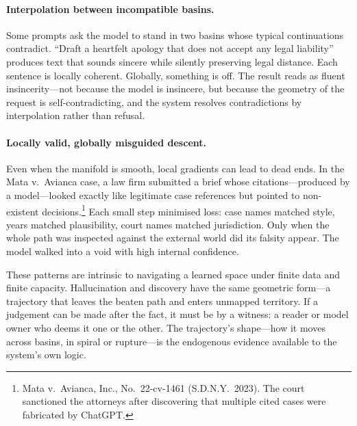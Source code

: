 \paragraph{Interpolation between incompatible basins.} Some prompts ask the model to stand in two basins whose typical continuations contradict. ``Draft a heartfelt apology that does not accept any legal liability'' produces text that sounds sincere while silently preserving legal distance. Each sentence is locally coherent. Globally, something is off. The result reads as fluent insincerity---not because the model is insincere, but because the geometry of the request is self-contradicting, and the system resolves contradictions by interpolation rather than refusal.

\paragraph{Locally valid, globally misguided descent.} Even when the manifold is smooth, local gradients can lead to dead ends. In the Mata v.\ Avianca case, a law firm submitted a brief whose citations---produced by a model---looked exactly like legitimate case references but pointed to non-existent decisions.\footnote{Mata v.\ Avianca, Inc., No.\ 22-cv-1461 (S.D.N.Y.\ 2023). The court sanctioned the attorneys after discovering that multiple cited cases were fabricated by ChatGPT.} Each small step minimised loss: case names matched style, years matched plausibility, court names matched jurisdiction. Only when the whole path was inspected against the external world did its falsity appear. The model walked into a void with high internal confidence.

These patterns are intrinsic to navigating a learned space under finite data and finite capacity. Hallucination and discovery have the same geometric form---a trajectory that leaves the beaten path and enters unmapped territory. If a judgement can be made after the fact, it must be by a witness: a reader or model owner who deems it one or the other. The trajectory's shape---how it moves across basins, in spiral or rupture---is the endogenous evidence available to the system's own logic.


